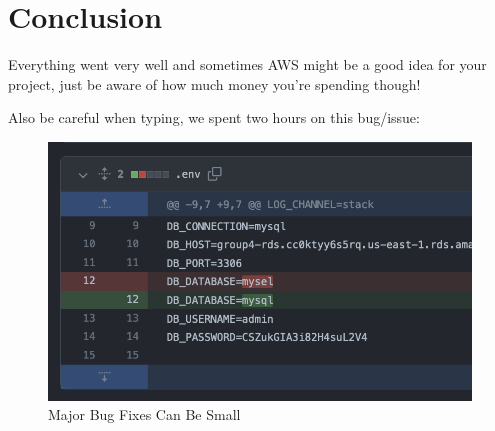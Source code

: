 \chapter{Conclusion}
Everything went very well and sometimes AWS might be a good idea for your project, just be aware of how much money you're spending though!

Also be careful when typing, we spent two hours on this bug/issue:


\begin{figure}[!htbp]
    \centering
    \includegraphics[width=\textwidth]{resources/rds/mysql.png}
    \caption{Major Bug Fixes Can Be Small}
    \label{fig:bug-fudge}
\end{figure}